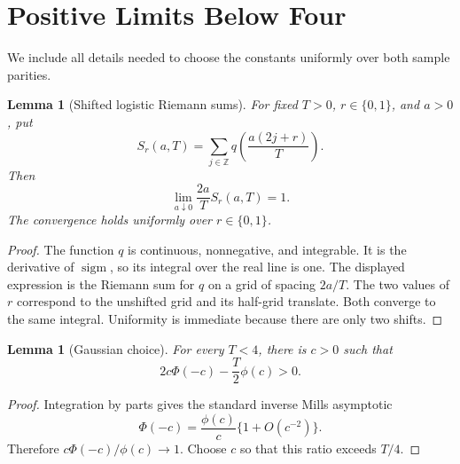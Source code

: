 \documentclass[twoside]{article}
\newtheorem{lemma}[theorem]{Lemma}
\newcommand{\sigm}{\operatorname{sigm}}
\begin{document}
\section{Positive Limits Below Four}

We include all details needed to choose the constants uniformly over both sample parities.

\begin{lemma}[Shifted logistic Riemann sums]
\label{lem:riemann}
For fixed $T>0$, $r\in\{0,1\}$, and $a>0$, put
\[
S_r(a,T)=\sum_{j\in\mathbb Z}q\left(\frac{a(2j+r)}T\right).
\]
Then
\[
\lim_{a\downarrow0}\frac{2a}{T}S_r(a,T)=1.
\]
The convergence holds uniformly over $r\in\{0,1\}$.
\end{lemma}

\begin{proof}
The function $q$ is continuous, nonnegative, and integrable. It is the derivative of $\sigm$, so its integral over the real line is one. The displayed expression is the Riemann sum for $q$ on a grid of spacing $2a/T$. The two values of $r$ correspond to the unshifted grid and its half-grid translate. Both converge to the same integral. Uniformity is immediate because there are only two shifts.
\end{proof}

\begin{lemma}[Gaussian choice]
\label{lem:mills}
For every $T<4$, there is $c>0$ such that
\[
2c\Phi(-c)-\frac{T}{2}\phi(c)>0.
\]
\end{lemma}

\begin{proof}
Integration by parts gives the standard inverse Mills asymptotic
\[
\Phi(-c)=\frac{\phi(c)}c\{1+O(c^{-2})\}.
\]
Therefore $c\Phi(-c)/\phi(c)\to1$. Choose $c$ so that this ratio exceeds $T/4$.
\end{proof}
\end{document}
